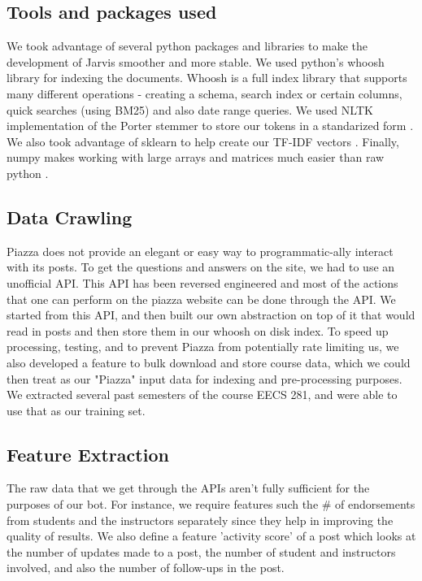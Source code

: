 \documentclass[sigconf]{acmart}
\begin{document}
\subsection{Tools and packages used}
We took advantage of several python packages and libraries to make the development of Jarvis smoother and more stable. We used python's whoosh library for indexing the documents. Whoosh is a full index library that supports many different operations - creating a schema, search index or certain columns, quick searches (using BM25) and also date range queries. We used NLTK implementation of the Porter stemmer to store our tokens in a standarized form \cite{nltk}. We also took advantage of sklearn to help create our TF-IDF vectors \cite{sklearn}. Finally, numpy makes working with large arrays and matrices much easier than raw python \cite{numpy}.

\subsection{Data Crawling}
Piazza does not provide an elegant or easy way to programmatic-ally interact with its posts. To get the questions and answers on the site, we had to use an unofficial API. This API has been reversed engineered \cite{pythonwhoosh} and most of the actions that one can perform on the piazza website can be done through the API. We started from this API, and then built our own abstraction on top of it that would read in posts and then store them in our whoosh on disk index. To speed up processing, testing, and to prevent Piazza from potentially rate limiting us, we also developed a feature to bulk download and store course data, which we could then treat as our "Piazza" input data for indexing and pre-processing purposes. We extracted several past semesters of the course EECS 281, and were able to use that as our training set.


\subsection{Feature Extraction}
The raw data that we get through the APIs aren't fully sufficient for the purposes of our bot. For instance, we require features such the \# of endorsements from students and the instructors separately since they help in improving the quality of results. We also define a feature 'activity score' of a post which looks at the number of updates made to a post, the number of student and instructors involved, and also the number of follow-ups in the post.
\end{document}
